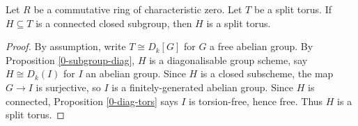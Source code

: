 \begin{proposition}
  \label{1-1-1-subgroup-torus}

  Let $R$ be a commutative ring of characteristic zero.
  Let $T$ be a split torus.
  If $H \subseteq T$ is a connected closed subgroup, then $H$ is a split torus.
\end{proposition}
\begin{proof}

  By assumption, write $T \cong D_k[G]$ for $G$ a free abelian group.
  By Proposition \ref{0-subgroup-diag}, $H$ is a diagonalisable group scheme,
  say $H \cong D_k(I)$ for $I$ an abelian group.
  Since $H$ is a closed subscheme, the map $G \to I$ is surjective,
  so $I$ is a finitely-generated abelian group.
  Since $H$ is connected, Proposition \ref{0-diag-tors} says $I$ is torsion-free, hence free.
  Thus $H$ is a split torus.
\end{proof}

